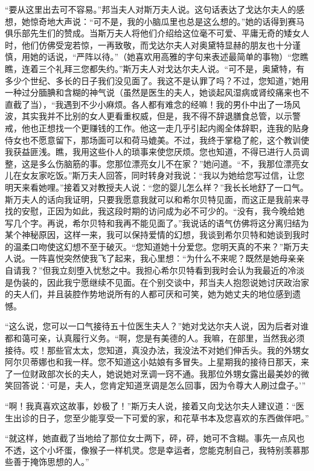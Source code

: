 \par “要从这里出去可不容易。”邦当夫人对斯万夫人说。这句话表达了戈达尔夫人的感想，她惊奇地大声说：“可不是，我的小脑瓜里也总是这么想的。”她的话得到赛马俱乐部先生们的赞成。当斯万夫人将他们介绍给这位毫不可爱、平庸无奇的矮女人时，他们仿佛受宠若惊，一再致敬，而戈达尔夫人对奥黛特显赫的朋友也十分谨慎，用她的话说，“严阵以待。”（她喜欢用高雅的字句来表述最简单的事物）“您瞧瞧，连着三个礼拜三您都失约。”斯万夫人对戈达尔夫人说。“可不是，奥黛特，有多少个世纪、多长的日子我们没见面了。我这不是认罪了吗？不过，您知道，”她用一种过分腼腆和含糊的神气说（虽然是医生的夫人，她谈起风湿病或肾绞痛来也不直截了当），“我遇到不少小麻烦。各人都有难念的经嘛！我的男仆中出了一场风波，其实我并不比别的女人更看重权威，但是，我不得不辞退膳食总管，以示警戒，他也正想找一个更赚钱的工作。他这一走几乎引起内阁全体辞职，连我的贴身侍女也不愿意留下，那场面可以和荷马媲美。不过，我终于掌稳了舵，这个教训使我获益匪浅。瞧，我用这些仆人的琐事来使您厌烦。您也知道，不得已进行人员调整，这是多么伤脑筋的事。您那位漂亮女儿不在家？”她问道。“不，我那位漂亮女儿在女友家吃饭。”斯万夫人回答，同时转身对我说：“我以为她给您写过信，让您明天来看她哩。”接着又对教授夫人说：“您的婴儿怎么样？”我长长地舒了一口气。斯万夫人的话向我证明，只要我愿意我就可以和希尔贝特见面，而这正是我前来寻找的安慰，正因为如此，我这段时期的访问成为必不可少的。“没有，我今晚给她写几个字。再说，希尔贝特和我再不能见面了。”我说话的语气仿佛将这分离归结为某个神秘原因，这样一来，我可以保持爱情的幻想，我谈到希尔贝特和她谈到我时的温柔口吻使这幻想不至于破灭。“您知道她十分爱您。您明天真的不来？”斯万夫人说。一阵喜悦突然使我飞了起来，我心里想：“为什么不来呢？既然是她母亲亲自请我？”但我立刻堕入忧愁之中。我担心希尔贝特看到我时会认为我最近的冷淡是伪装的，因此我宁愿继续不见面。在个别交谈中，邦当夫人抱怨说她讨厌政治家的夫人们，并且装腔作势地说所有的人都可厌和可笑，她为她丈夫的地位感到遗憾。
\par “这么说，您可以一口气接待五十位医生夫人？”她对戈达尔夫人说，因为后者对谁都和蔼可亲，认真履行义务。“啊，您是有美德的人。我嘛，在部里，当然我必须接待。哎！那些官太太，您知道，真没办法，我没法不对她们伸舌头。我的外甥女阿尔贝蒂娜也和我一样。您不知道这小姑娘有多冒失。上星期我的接待日那天，来了一位财政部次长的夫人，她说她对烹调一窍不通。我那位外甥女露出最美妙的微笑回答说：‘可是，夫人，您肯定知道烹调是怎么回事，因为令尊大人刷过盘子。’”
\par “啊！我真喜欢这故事，妙极了！”斯万夫人说，接着又向戈达尔夫人建议道：“医生出诊的日子，您至少能享受一下可爱的家，和花草书本及您喜欢的东西做伴吧。”
\par “就这样，她直截了当地给了那位女士两下，砰，砰，她可不含糊。事先一点风也不透，这个小坏蛋，像猴子一样机灵。您是幸运者，您能克制自己，我特别羡慕那些善于掩饰思想的人。”
